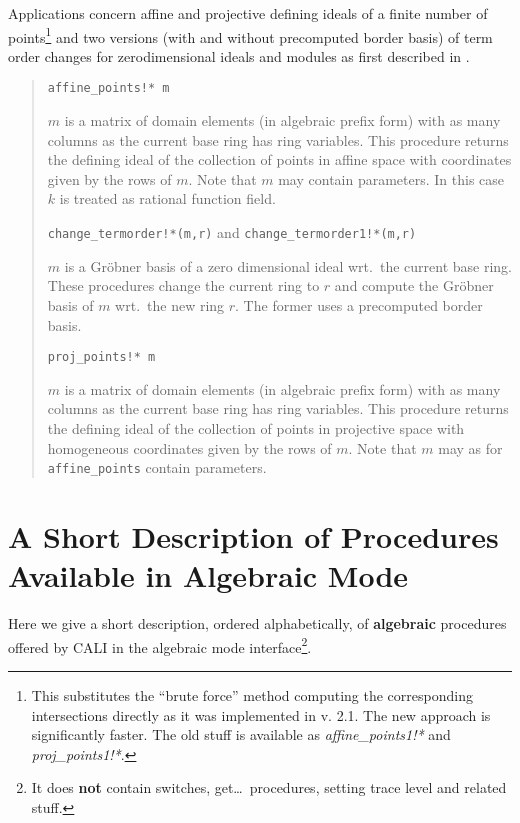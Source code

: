 \documentclass[a4paper,11pt]{article}
\newcommand{\gr}{Gr\"obner}
\newcommand{\ind}[1]{{\em #1}\index{#1}}
\newcommand{\pbx}[1]{\mbox{}\hfill \parbox[t]{12cm}{#1} \pagebreak[3]}
\begin{document}
Applications concern affine and projective defining ideals of a finite 
number of points\footnote{This substitutes the ``brute force'' method
computing the corresponding intersections directly as it was
implemented in v. 2.1. The new approach is significantly faster. The
old stuff is available as \ind{affine\_points1!*} and
\ind{proj\_points1!*}.} and two versions (with and without precomputed
border basis) of term order  
changes for zerodimensional ideals and modules as first described in
\cite{FGLM}.  
\begin{quote}
\verb|affine_points!* m| 

\pbx{$m$ is a matrix of domain elements (in algebraic prefix form)
with as many columns as the current base ring has ring variables. This
procedure returns the defining ideal of the collection of points in
affine space with coordinates given by the rows of $m$. Note that $m$
may contain parameters. In this case $k$ is treated as rational
function field.} 

\verb|change_termorder!*(m,r)| and \verb|change_termorder1!*(m,r)| 

\pbx{$m$ is a {\gr} basis of a zero dimensional ideal wrt.\ the current
base ring. These procedures change the current ring to $r$ and compute
the {\gr} basis of $m$ wrt.\ the new ring $r$. The former uses a
precomputed border basis.} 

\verb|proj_points!* m| 

\pbx{$m$ is a matrix of domain elements (in algebraic prefix form)
with as many columns as the current base ring has ring variables. This
procedure returns the defining ideal of the collection of points in
projective space with homogeneous coordinates given by the rows of
$m$. Note that $m$ may as for {\tt affine\_points} contain
parameters.}  
\end{quote}

\pagebreak

\appendix
\section{A Short Description of Procedures Available in Algebraic
Mode} 

Here we give a short description, ordered alphabetically, of {\bf
algebraic} procedures offered by CALI in the algebraic mode
interface\footnote{It does {\bf not} contain switches, get\ldots\
procedures, setting trace level and related stuff.}. 
\end{document}
